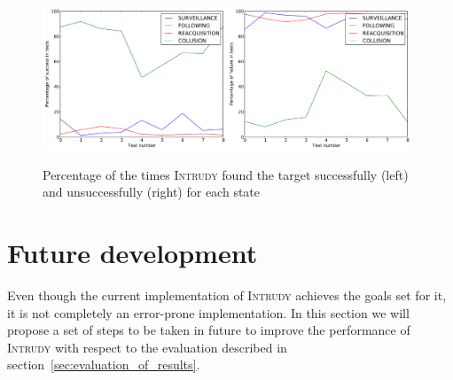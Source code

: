\documentclass[12pt,a4paper]{scrartcl}
\newcommand{\intrudy}{\textsc{Intrudy}\xspace}
\begin{document}
		\begin{figure}
			\center
			\includegraphics[width=0.49\textwidth]{img/plot1}\includegraphics[width=0.49\textwidth]{img/plot2}
			\caption{Percentage of the times \intrudy found the target successfully	(left) and unsuccessfully (right) for each state}
			\label{fig:intrudy_success_and_fail}
		\end{figure}


	

\newpage

\section{Future development} %
\label{sec:future_development}
Even though the current implementation of \intrudy achieves the goals set for it, it is not completely an error-prone implementation. In this section we will propose a set of steps to be taken in future to improve the performance of \intrudy with respect to the evaluation described in section~\ref{sec:evaluation_of_results}.
\end{document}
